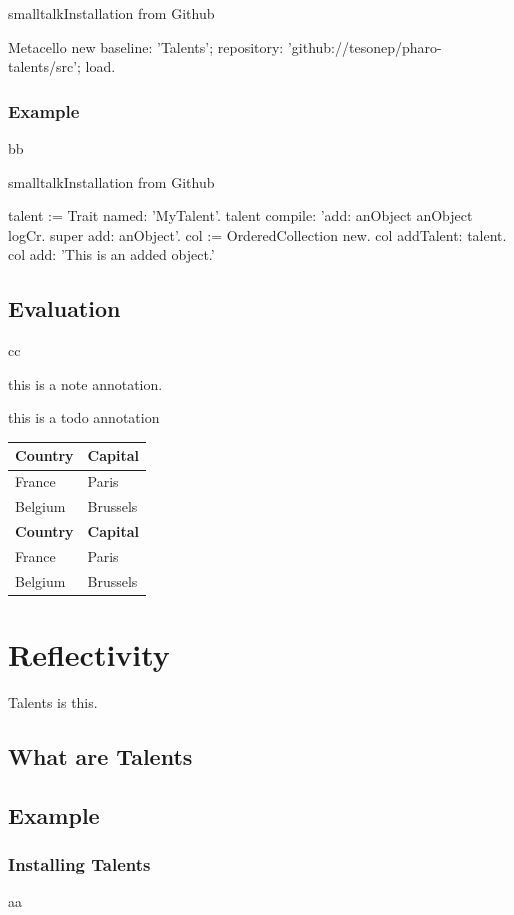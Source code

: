 \documentclass[10pt,twoside,english]{_support/latex/sbabook/sbabook}
\begin{document}
\begin{listing}[float, label=install]{smalltalk}{Installation from Github}

Metacello new
  baseline: 'Talents';
  repository: 'github://tesonep/pharo-talents/src';
  load.
\end{listing}
\subsection{Example}
bb

\begin{listing}[float, label=talent-example]{smalltalk}{Installation from Github}

talent := Trait named: 'MyTalent'.
talent compile: 'add: anObject
anObject logCr.
super add: anObject'.
col := OrderedCollection new.
col addTalent: talent.
col add: 'This is an added object.'
\end{listing}
\section{Evaluation}
cc

\begin{note}
this is a note annotation.
\end{note}

\begin{todo}
this is a todo annotation
\end{todo}

\begin{tabular}{ll}
\toprule
\textbf{Country} & \textbf{Capital} \\
\midrule
France & Paris \\
Belgium & Brussels \\
\textbf{Country} & \textbf{Capital} \\
\midrule
France & Paris \\
Belgium & Brussels \\
\bottomrule
\end{tabular}
\chapter{Reflectivity}
Talents is this.
\section{What are Talents}\section{Example}\subsection{Installing Talents}
aa
\end{document}
